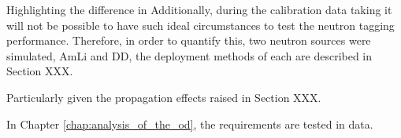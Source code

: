 \par
Highlighting the difference in
Additionally, during the calibration data taking it will not be possible to have such ideal circumstances to test the neutron tagging performance.
Therefore, in order to quantify this, two neutron sources were simulated, AmLi and DD, the deployment methods of each are described in Section XXX.


Particularly given the propagation effects raised in Section XXX.
\par
In Chapter \ref{chap:analysis_of_the_od}, the requirements are tested in data.